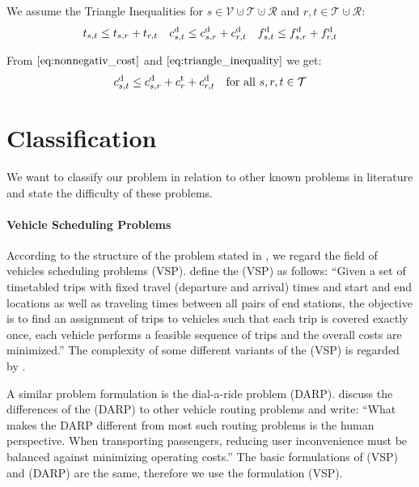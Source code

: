 We assume the Triangle Inequalities for $s\in\mathcal{V}\cupdot\mathcal{T}\cupdot\mathcal{R}$ and $r,t\in\mathcal{T}\cupdot\mathcal{R}$:
\begin{align}
\label{eq:triangle_inequality}
	t_{s,t} \leq t_{s,r} + t_{r,t} && c^{\operatorname{d}}_{s,t} \leq c^{\operatorname{d}}_{s,r} + c^{\operatorname{d}}_{r,t} && f^{\operatorname{d}}_{s,t} \leq f^{\operatorname{d}}_{s,r} + f^{\operatorname{d}}_{r,t}
\end{align}

From $\eqref{eq:nonnegativ_cost}$ and $\eqref{eq:triangle_inequality}$ we get:
\begin{align}
\label{eq:triangle_inequality_ext}
	c^{\operatorname{d}}_{s,t} \leq c^{\operatorname{d}}_{s,r} + c^{\operatorname{t}}_{r} + c^{\operatorname{d}}_{r,t} && \text{for all } s,r,t\in\mathcal{T}	
\end{align}


\section{Classification}
\label{sec:classification}

We want to classify our problem in relation to other known problems in literature and state the difficulty of these problems.

\paragraph{Vehicle Scheduling Problems} \parfill

According to the structure of the problem stated in , we regard the field of vehicles scheduling problems (VSP). \cite{Bunte_Kliewer} define the (VSP) as follows: \enquote{Given a set of timetabled trips with fixed travel (departure and arrival) times and start and end locations as well as traveling times between all pairs of end stations, the objective is to find an assignment of trips to vehicles such that each trip is covered exactly once, each vehicle performs a feasible sequence of trips and the overall costs are minimized.} The complexity of some different variants of the (VSP) is regarded by \cite{Lenstra_Kan}.

A similar problem formulation is the dial-a-ride problem (DARP). \cite{Cordeau_Laporte} discuss the differences of the (DARP) to other vehicle routing problems and write: \enquote{What makes the DARP different from most such routing problems is the human perspective. When transporting passengers, reducing user inconvenience must be balanced against minimizing operating costs.} The basic formulations of (VSP) and (DARP) are the same, therefore we use the formulation (VSP).

